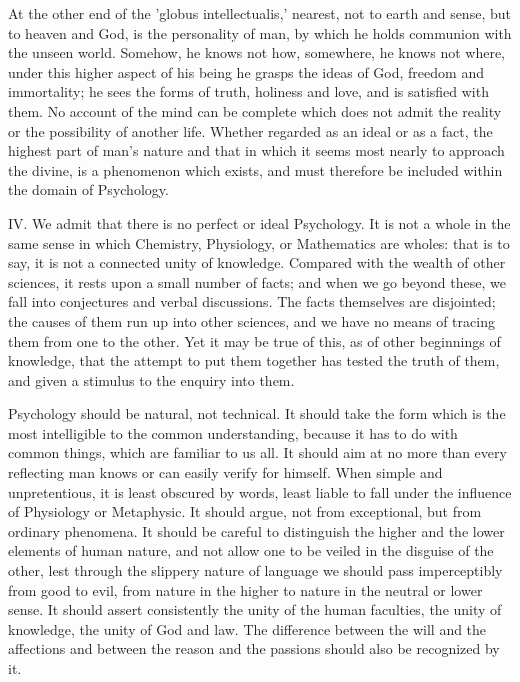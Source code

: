 At the other end of the 'globus intellectualis,' nearest, not to earth
and sense, but to heaven and God, is the personality of man, by which
he holds communion with the unseen world. Somehow, he knows not how,
somewhere, he knows not where, under this higher aspect of his being he
grasps the ideas of God, freedom and immortality; he sees the forms of
truth, holiness and love, and is satisfied with them. No account of the
mind can be complete which does not admit the reality or the possibility
of another life. Whether regarded as an ideal or as a fact, the highest
part of man's nature and that in which it seems most nearly to approach
the divine, is a phenomenon which exists, and must therefore be included
within the domain of Psychology.

IV. We admit that there is no perfect or ideal Psychology. It is not a
whole in the same sense in which Chemistry, Physiology, or Mathematics
are wholes: that is to say, it is not a connected unity of knowledge.
Compared with the wealth of other sciences, it rests upon a small number
of facts; and when we go beyond these, we fall into conjectures and
verbal discussions. The facts themselves are disjointed; the causes of
them run up into other sciences, and we have no means of tracing
them from one to the other. Yet it may be true of this, as of other
beginnings of knowledge, that the attempt to put them together has
tested the truth of them, and given a stimulus to the enquiry into them.

Psychology should be natural, not technical. It should take the form
which is the most intelligible to the common understanding, because it
has to do with common things, which are familiar to us all. It should
aim at no more than every reflecting man knows or can easily verify for
himself. When simple and unpretentious, it is least obscured by words,
least liable to fall under the influence of Physiology or Metaphysic.
It should argue, not from exceptional, but from ordinary phenomena. It
should be careful to distinguish the higher and the lower elements of
human nature, and not allow one to be veiled in the disguise of the
other, lest through the slippery nature of language we should pass
imperceptibly from good to evil, from nature in the higher to nature in
the neutral or lower sense. It should assert consistently the unity of
the human faculties, the unity of knowledge, the unity of God and law.
The difference between the will and the affections and between the
reason and the passions should also be recognized by it.

